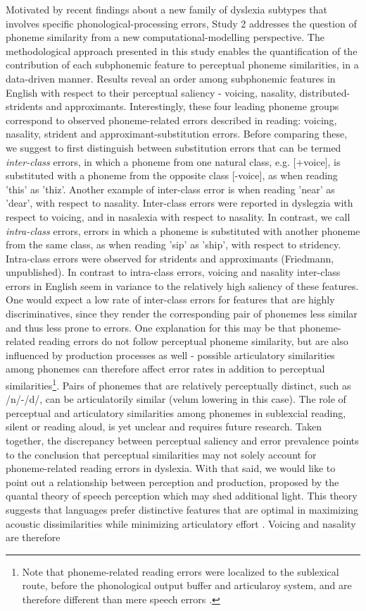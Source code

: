 Motivated by recent findings about a new family of dyslexia subtypes that involves specific phonological-processing errors, Study 2 addresses the question of phoneme similarity from a new computational-modelling perspective. The methodological approach presented in this study enables the quantification of the contribution of each subphonemic feature to perceptual phoneme similarities, in a data-driven manner. Results reveal an order among subphonemic features in English with respect to their perceptual saliency - voicing, nasality, distributed-stridents and approximants. Interestingly, these four leading phoneme groups correspond to observed phoneme-related errors described in reading: voicing, nasality, strident and approximant-substitution errors. Before comparing these, we suggest to first distinguish between substitution errors that can be termed \textit{inter-class} errors, in which a phoneme from one natural class, e.g. [+voice], is substituted with a phoneme from the opposite class [-voice], as when reading 'this' as 'thiz'. Another example of inter-class error is when reading 'near' as 'dear', with respect to nasality. Inter-class errors were reported in dyslegzia with respect to voicing, and in nasalexia with respect to nasality. In contrast, we call \textit{intra-class} errors, errors in which a phoneme is substituted with another phoneme from the same class, as when reading 'sip' as 'ship', with respect to stridency. Intra-class errors were observed for stridents and approximants (Friedmann, unpublished). In contrast to intra-class errors, voicing and nasality inter-class errors in English seem in variance to the relatively high saliency of these features. One would expect a low rate of inter-class errors for features that are highly discriminatives, since they render the corresponding pair of phonemes less similar and thus less prone to errors. One explanation for this may be that phoneme-related reading errors do not follow perceptual phoneme similarity, but are also influenced by production processes as well - possible articulatory similarities among phonemes can therefore affect error rates in addition to perceptual similarities\footnote{Note that phoneme-related reading errors were localized to the sublexical route, before the phonological output buffer and articularoy system, and are therefore different than mere speech errors \citep{Gvion2010}.}. Pairs of phonemes that are relatively perceptually distinct, such as /n/-/d/, can be articulatorily similar (velum lowering in this case). The role of perceptual and articulatory similarities among phonemes in sublexcial reading, silent or reading aloud, is yet unclear and requires future research. Taken together, the discrepancy between perceptual saliency and error prevalence points to the conclusion that perceptual similarities may not solely account for phoneme-related reading errors in dyslexia. With that said, we would like to point out a relationship between perception and production, proposed by the quantal theory of speech perception which may shed additional light. This theory suggests that languages prefer distinctive features that are optimal in maximizing acoustic dissimilarities while minimizing articulatory effort \citep{stevens1989quantal, stevens2002toward}. Voicing and nasality are therefore 